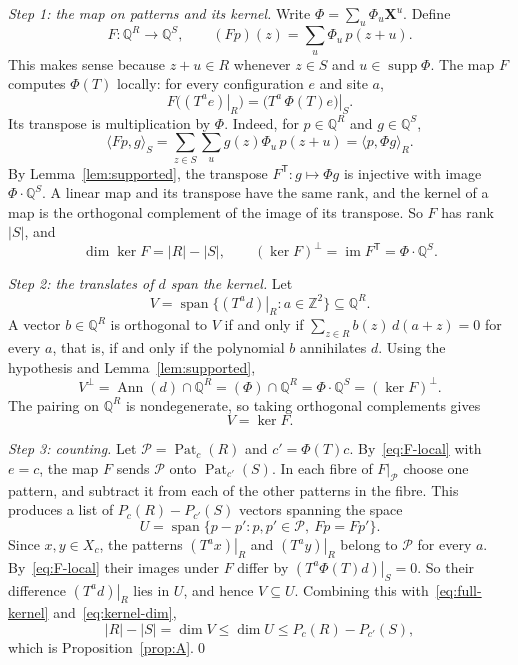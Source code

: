 \documentclass[11pt,a4paper,reqno]{amsart}
\theoremstyle{definition}
\theoremstyle{remark}
\newcommand{\Z}{\mathbb Z}
\newcommand{\Q}{\mathbb Q}
\newcommand{\mon}[1]{\boldsymbol X^{#1}}
\newcommand{\restr}[2]{\left.#1\right|_{#2}}
\DeclareMathOperator{\Ann}{Ann}
\DeclareMathOperator{\supp}{supp}
\DeclareMathOperator{\Pat}{Pat}
\DeclareMathOperator{\spanQ}{span}
\numberwithin{equation}{section}
\begin{document}
\emph{Step 1: the map on patterns and its kernel.} Write $\Phi=\sum_u\Phi_u\mon u$. Define
\[
 F\colon\Q^R\to\Q^S,\qquad (Fp)(z)=\sum_u\Phi_u\,p(z+u).
\]
This makes sense because $z+u\in R$ whenever $z\in S$ and $u\in\supp\Phi$. The map $F$ computes $\Phi(T)$ locally: for every configuration $e$ and site $a$,
\begin{equation}\label{eq:F-local}
 F\bigl(\restr{(T^ae)}{R}\bigr)=\restr{\bigl(T^a\,\Phi(T)e\bigr)}{S}.
\end{equation}
Its transpose is multiplication by $\Phi$. Indeed, for $p\in\Q^R$ and $g\in\Q^S$,
\[
 \langle Fp,g\rangle_S=\sum_{z\in S}\sum_u g(z)\Phi_u\,p(z+u)=\langle p,\Phi g\rangle_R.
\]
By Lemma~\ref{lem:supported}, the transpose $F^{\mathsf T}\colon g\mapsto\Phi g$ is injective with image $\Phi\cdot\Q^S$. A linear map and its transpose have the same rank, and the kernel of a map is the orthogonal complement of the image of its transpose. So $F$ has rank $|S|$, and
\begin{equation}\label{eq:kernel-dim}
 \dim\ker F=|R|-|S|,\qquad (\ker F)^\perp=\operatorname{im}F^{\mathsf T}=\Phi\cdot\Q^S.
\end{equation}

\emph{Step 2: the translates of $d$ span the kernel.} Let
\[
 V=\spanQ\bigl\{\restr{(T^ad)}{R}: a\in\Z^2\bigr\}\subseteq\Q^R.
\]
A vector $b\in\Q^R$ is orthogonal to $V$ if and only if $\sum_{z\in R}b(z)\,d(a+z)=0$ for every $a$, that is, if and only if the polynomial $b$ annihilates $d$. Using the hypothesis and Lemma~\ref{lem:supported},
\[
 V^\perp=\Ann(d)\cap\Q^R=(\Phi)\cap\Q^R=\Phi\cdot\Q^S=(\ker F)^\perp.
\]
The pairing on $\Q^R$ is nondegenerate, so taking orthogonal complements gives
\begin{equation}\label{eq:full-kernel}
 V=\ker F.
\end{equation}

\emph{Step 3: counting.} Let $\mathcal P=\Pat_c(R)$ and $c'=\Phi(T)c$. By~\eqref{eq:F-local} with $e=c$, the map $F$ sends $\mathcal P$ onto $\Pat_{c'}(S)$. In each fibre of $F|_{\mathcal P}$ choose one pattern, and subtract it from each of the other patterns in the fibre. This produces a list of $P_c(R)-P_{c'}(S)$ vectors spanning the space
\[
 U=\spanQ\{p-p': p,p'\in\mathcal P,\ Fp=Fp'\}.
\]
Since $x,y\in X_c$, the patterns $\restr{(T^ax)}{R}$ and $\restr{(T^ay)}{R}$ belong to $\mathcal P$ for every $a$. By~\eqref{eq:F-local} their images under $F$ differ by $\restr{(T^a\Phi(T)d)}{S}=0$. So their difference $\restr{(T^ad)}{R}$ lies in $U$, and hence $V\subseteq U$. Combining this with~\eqref{eq:full-kernel} and~\eqref{eq:kernel-dim},
\[
 |R|-|S|=\dim V\le\dim U\le P_c(R)-P_{c'}(S),
\]
which is Proposition~\ref{prop:A}.\qed
\end{document}
